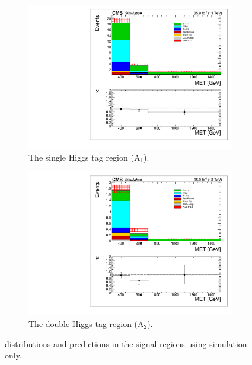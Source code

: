 \begin{figure}[hbp!]
\begin{subfigure}[b]{0.5\textwidth}
\centering
\includegraphics[trim={5px 5px 5px 5px},clip,width=\textwidth]{figs/SUS17006/MCclosure_singleHiggsRegionTotal.pdf}
\caption{The single Higgs tag region (A$_{1}$).}
\end{subfigure}
\begin{subfigure}[b]{0.5\textwidth}
\centering
\includegraphics[trim={5px 5px 5px 5px},clip,width=\textwidth]{figs/SUS17006/MCclosure_doubleHiggsRegionTotal.pdf} 
\caption{The double Higgs tag region (A$_{2}$).}
\end{subfigure}
\caption{\ptmiss distributions and predictions in the signal regions using simulation only.}
\label{fig:mcclosure}
\end{figure}

